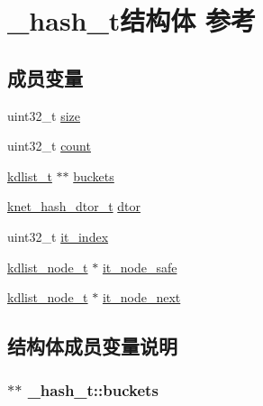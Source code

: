 \hypertarget{a00015}{}\section{\+\_\+hash\+\_\+t结构体 参考}
\label{a00015}
\subsection*{成员变量}
\begin{DoxyCompactItemize}
\item 
uint32\+\_\+t \hyperlink{a00015_a670ef62d04ed8614eb5c921e8610c0eb_a670ef62d04ed8614eb5c921e8610c0eb}{size}
\item 
uint32\+\_\+t \hyperlink{a00015_a49e8948b5242af0d06671e5a9e4bf299_a49e8948b5242af0d06671e5a9e4bf299}{count}
\item 
\hyperlink{a00066_ae098586334a621a23cef7cb17590b618_ae098586334a621a23cef7cb17590b618}{kdlist\+\_\+t} $\ast$$\ast$ \hyperlink{a00015_abb34478fc7197949ecfe1f840e059ef8_abb34478fc7197949ecfe1f840e059ef8}{buckets}
\item 
\hyperlink{a00066_af806592520383146be2f3aac316beb45_af806592520383146be2f3aac316beb45}{knet\+\_\+hash\+\_\+dtor\+\_\+t} \hyperlink{a00015_afb54b9a59d24504fe8c2ae78b269e889_afb54b9a59d24504fe8c2ae78b269e889}{dtor}
\item 
uint32\+\_\+t \hyperlink{a00015_a0508ecea0c72d04bae0c5238d14f1b64_a0508ecea0c72d04bae0c5238d14f1b64}{it\+\_\+index}
\item 
\hyperlink{a00066_ac701f00a0851c97467ae35c382b316b7_ac701f00a0851c97467ae35c382b316b7}{kdlist\+\_\+node\+\_\+t} $\ast$ \hyperlink{a00015_a0866f597371d3d6627568fada2df8e45_a0866f597371d3d6627568fada2df8e45}{it\+\_\+node\+\_\+safe}
\item 
\hyperlink{a00066_ac701f00a0851c97467ae35c382b316b7_ac701f00a0851c97467ae35c382b316b7}{kdlist\+\_\+node\+\_\+t} $\ast$ \hyperlink{a00015_a57a0237d618c050e83cb96d834d92dcd_a57a0237d618c050e83cb96d834d92dcd}{it\+\_\+node\+\_\+next}
\end{DoxyCompactItemize}


\subsection{结构体成员变量说明}
\hypertarget{a00015_abb34478fc7197949ecfe1f840e059ef8_abb34478fc7197949ecfe1f840e059ef8}{}
\subsubsection[{buckets}]{$\ast$$\ast$ \+\_\+hash\+\_\+t\+::buckets}\label{a00015_abb34478fc7197949ecfe1f840e059ef8_abb34478fc7197949ecfe1f840e059ef8}
\hypertarget{a00015_a49e8948b5242af0d06671e5a9e4bf299_a49e8948b5242af0d06671e5a9e4bf299}{}
